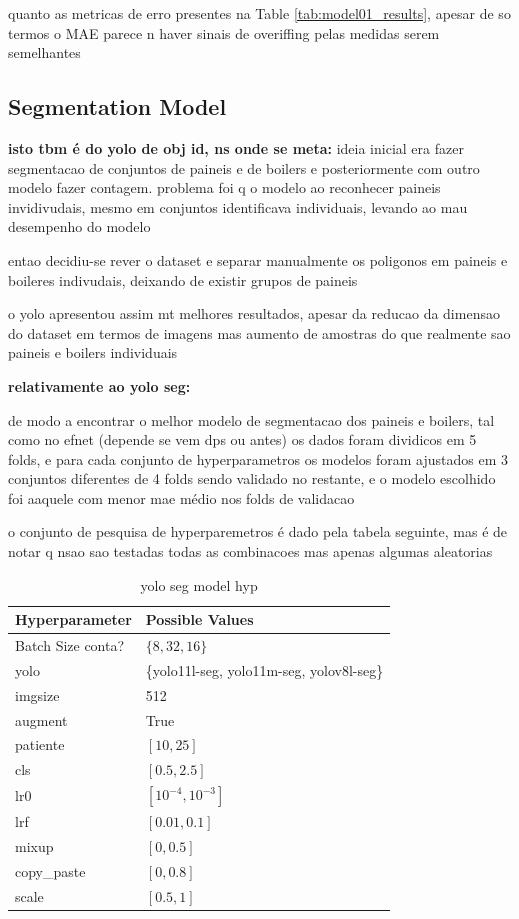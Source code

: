 \documentclass[conference]{IEEEtran}
\begin{document}
quanto as metricas de erro presentes na Table \ref{tab:model01_results}, apesar de so termos o MAE parece n haver sinais de overiffing pelas medidas serem semelhantes

\subsection{Segmentation Model}



\textbf{isto tbm é do yolo de obj id, ns onde se meta:} ideia inicial era fazer segmentacao de conjuntos de paineis e de boilers e posteriormente com outro modelo fazer contagem. problema foi q o modelo ao reconhecer paineis invidivudais, mesmo em conjuntos identificava individuais, levando ao mau desempenho do modelo

entao decidiu-se rever o dataset e separar manualmente os poligonos em paineis e boileres indivudais, deixando de existir grupos de paineis

o yolo apresentou assim mt melhores resultados, apesar da reducao da dimensao do dataset em termos de imagens mas aumento de amostras do que realmente sao paineis e boilers individuais

\textbf{relativamente ao yolo seg:}

de modo a encontrar o melhor modelo de segmentacao dos paineis e boilers, tal como no efnet (depende se vem dps ou antes) os dados foram dividicos em 5 folds, e para cada conjunto de hyperparametros os modelos foram ajustados em 3 conjuntos diferentes de 4 folds sendo validado no restante, e o modelo escolhido foi aaquele com menor mae médio nos folds de validacao

o conjunto de pesquisa de hyperparemetros é dado pela tabela seguinte, mas é de notar q nsao sao testadas todas as combinacoes mas apenas algumas aleatorias


\begin{table}[H]
\centering
\caption{yolo seg model hyp}
\label{parametroszulp}
\begin{tabular}{ll}
\toprule
\textbf{Hyperparameter} & \textbf{Possible Values} \\
\midrule
Batch Size conta? & $\{8, 32, 16\}$ \\
yolo & \{yolo11l-seg, yolo11m-seg, yolov8l-seg\} \\
imgsize & 512 \\
augment & True \\
patiente & $[10, 25]$ \\
cls & $[0.5, 2.5]$ \\
lr0 & $[10^{-4}, 10^{-3}]$ \\
lrf & $[0.01, 0.1]$ \\
mixup & $[0, 0.5]$ \\
copy\_paste & $[0, 0.8]$ \\
scale & $[0.5, 1]$ \\
\bottomrule
\end{tabular}
\end{table}
\end{document}
